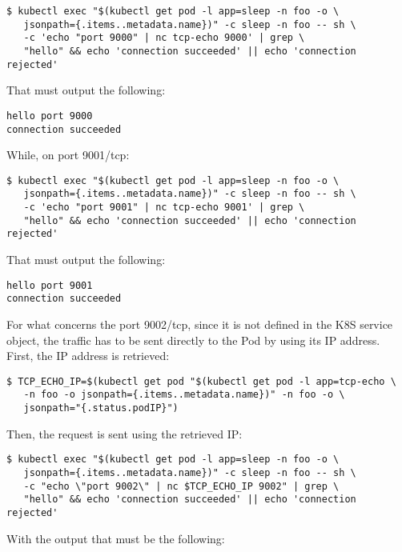 \label{commands}
\begin{lstlisting}
$ kubectl exec "$(kubectl get pod -l app=sleep -n foo -o \
   jsonpath={.items..metadata.name})" -c sleep -n foo -- sh \ 
   -c 'echo "port 9000" | nc tcp-echo 9000' | grep \
   "hello" && echo 'connection succeeded' || echo 'connection rejected'
\end{lstlisting}

\noindent That must output the following:

\begin{lstlisting}
hello port 9000
connection succeeded
\end{lstlisting}

\noindent While, on port 9001/tcp:

\begin{lstlisting}
$ kubectl exec "$(kubectl get pod -l app=sleep -n foo -o \
   jsonpath={.items..metadata.name})" -c sleep -n foo -- sh \ 
   -c 'echo "port 9001" | nc tcp-echo 9001' | grep \
   "hello" && echo 'connection succeeded' || echo 'connection rejected'
\end{lstlisting}

\noindent That must output the following:

\begin{lstlisting}
hello port 9001
connection succeeded
\end{lstlisting}

\noindent For what concerns the port 9002/tcp, since it is not defined in the K8S service object, the traffic has to be sent directly to the Pod by using its IP address. First, the IP address is retrieved:

\begin{lstlisting}
$ TCP_ECHO_IP=$(kubectl get pod "$(kubectl get pod -l app=tcp-echo \
   -n foo -o jsonpath={.items..metadata.name})" -n foo -o \
   jsonpath="{.status.podIP}")
\end{lstlisting}

\noindent Then, the request is sent using the retrieved IP:

\begin{lstlisting}
$ kubectl exec "$(kubectl get pod -l app=sleep -n foo -o \
   jsonpath={.items..metadata.name})" -c sleep -n foo -- sh \ 
   -c "echo \"port 9002\" | nc $TCP_ECHO_IP 9002" | grep \
   "hello" && echo 'connection succeeded' || echo 'connection rejected'
\end{lstlisting}

\noindent With the output that must be the following:

